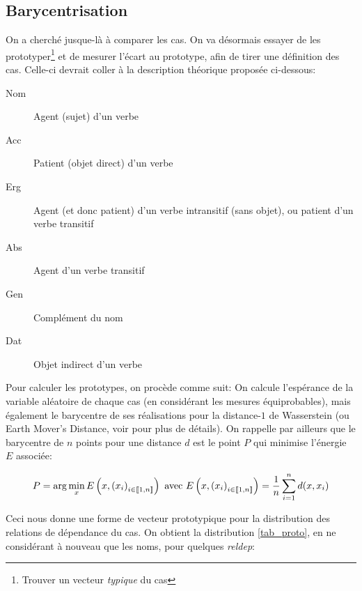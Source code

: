\documentclass{cours}
\begin{document}
\subsection{Barycentrisation}\label{subsec:bary}
On a cherché jusque-là à comparer les cas.
On va désormais essayer de les prototyper\footnote{Trouver un vecteur \textit{typique} du cas} et de mesurer l'écart au prototype, afin de tirer une définition des cas.
Celle-ci devrait coller à la description théorique proposée ci-dessous:
\begin{multicols}{2}
	\begin{description}
		\item[Nom] Agent (sujet) d'un verbe
		\item[Acc] Patient (objet direct) d'un verbe
		\item[Erg] Agent (et donc patient) d'un verbe intransitif (sans objet), ou patient d'un verbe transitif
		\item[Abs] Agent d'un verbe transitif
		\item[Gen] Complément du nom
		\item[Dat] Objet indirect d'un verbe
	\end{description}
\end{multicols}
Pour calculer les prototypes, on procède comme suit:
On calcule l'espérance de la variable aléatoire de chaque cas (en considérant les mesures équiprobables), mais également le barycentre de ses réalisations pour la distance-$1$ de Wasserstein (ou Earth Mover's Distance, voir \cite{PythonPOT} pour plus de détails).
On rappelle par ailleurs que le barycentre de $n$ points pour une distance $d$ est le point $P$ qui minimise l'énergie $E$ associée:

\begin{equation*}
	P = \arg\min_{x} E\left(x, \left(x_{i}\right)_{i \in \left\llbracket 1, n\right\rrbracket}\right) \text{ avec } E\left(x, \left(x_{i}\right)_{i \in \left\llbracket 1, n\right\rrbracket}\right) = \frac{1}{n}\sum_{i = 1}^{n} d(x, x_{i})
\end{equation*}

Ceci nous donne une forme de vecteur prototypique pour la distribution des relations de dépendance du cas.
On obtient la distribution \ref{tab_proto}, en ne considérant à nouveau que les noms, pour quelques \textit{reldep}:
\end{document}
